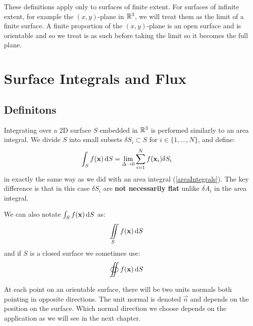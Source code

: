 \documentclass[../main.tex]{subfiles}
\begin{document}
These definitions apply only to surfaces of finite extent.
For surfaces of infinite extent, for example the $(x, y)$-plane in $\mathbb{R}^3$, we will treat them as the limit of a finite surface.
A finite proportion of the $(x, y)$-plane is an open surface and is orientable and so we treat is as such before taking the limit so it becomes the full plane.
\section{Surface Integrals and Flux}
\subsection{Definitons}
Integrating over a 2D surface $S$ embedded in $\mathbb{R}^3$ is performed similarly to an area integral.
We divide $S$ into small subsets $\delta S_i \subset S$ for $i \in \{1, \ldots, N\}$, and define:
\[
  \int_{S} f(\vec{x}) \d{S} = \lim_{\Delta \to 0} \sum_{i = 1}^{N} f(\vec{x}_i)\delta S_i
\]
in exactly the same way as we did with an area integral (\cref{areaIntegrals}).
The key difference is that in this case $\delta S_i$ are \textbf{not necessarily flat} unlike $\delta A_i$ in the area integral.
\begin{remark}[Notation]
  We can also notate $\int_S f(\vec{x}) \d{S}$ as:
  \[
    \iint\limits_S f(\vec{x}) \d{S}
  \]
  and if $S$ is a closed surface we sometimes use:
  \[
    \oiint f(\vec{x}) \d{S}
  \]
\end{remark}
At each point on an orientable surface, there will be two units normals both pointing in opposite directions.
The unit normal is denoted $\vec{n}$ and depends on the position on the surface.
Which normal direction we choose depends on the application as we will see in the next chapter.
\end{document}
